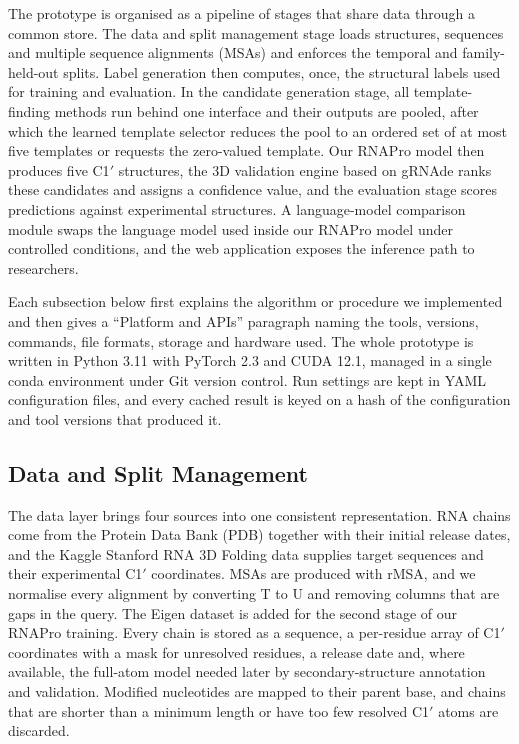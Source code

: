 \documentclass{FastFyp}
\begin{document}
The prototype is organised as a pipeline of stages that share data through a common store. The data and split management stage loads structures, sequences and multiple sequence alignments (MSAs) and enforces the temporal and family-held-out splits. Label generation then computes, once, the structural labels used for training and evaluation. In the candidate generation stage, all template-finding methods run behind one interface and their outputs are pooled, after which the learned template selector reduces the pool to an ordered set of at most five templates or requests the zero-valued template. Our RNAPro model then produces five C1$'$ structures, the 3D validation engine based on gRNAde \cite{joshi2025grnade} ranks these candidates and assigns a confidence value, and the evaluation stage scores predictions against experimental structures. A language-model comparison module swaps the language model used inside our RNAPro model under controlled conditions, and the web application exposes the inference path to researchers.

Each subsection below first explains the algorithm or procedure we implemented and then gives a ``Platform and APIs'' paragraph naming the tools, versions, commands, file formats, storage and hardware used. The whole prototype is written in Python 3.11 with PyTorch 2.3 and CUDA 12.1, managed in a single conda environment under Git version control. Run settings are kept in YAML configuration files, and every cached result is keyed on a hash of the configuration and tool versions that produced it.

\subsection{Data and Split Management}
\label{sec:impl-data}
The data layer brings four sources into one consistent representation. RNA chains come from the Protein Data Bank (PDB) together with their initial release dates, and the Kaggle Stanford RNA 3D Folding data supplies target sequences and their experimental C1$'$ coordinates. MSAs are produced with rMSA, and we normalise every alignment by converting T to U and removing columns that are gaps in the query. The Eigen dataset is added for the second stage of our RNAPro training. Every chain is stored as a sequence, a per-residue array of C1$'$ coordinates with a mask for unresolved residues, a release date and, where available, the full-atom model needed later by secondary-structure annotation and validation. Modified nucleotides are mapped to their parent base, and chains that are shorter than a minimum length or have too few resolved C1$'$ atoms are discarded.
\end{document}

